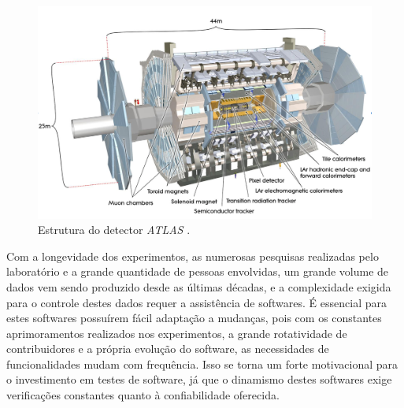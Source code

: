 \begin{figure}[H]
    \centering
    \includegraphics[width=14cm]{source/2-contextualizacao/images/atlas-detector.png}
    \caption{Estrutura do detector \emph{ATLAS} \cite{atlas}.}
    \label{fig:atlas-detector}
\end{figure}

Com a longevidade dos experimentos, as numerosas pesquisas realizadas pelo laboratório e a grande quantidade de pessoas envolvidas, um grande volume de dados vem sendo produzido desde as últimas décadas, e a complexidade exigida para o controle destes dados requer a assistência de softwares. É essencial para estes softwares possuírem fácil adaptação a mudanças, pois com os constantes aprimoramentos realizados nos experimentos, a grande rotatividade de contribuidores e a própria evolução do software, as necessidades de funcionalidades mudam com frequência. Isso se torna um forte motivacional para o investimento em testes de software, já que o dinamismo destes softwares exige verificações constantes quanto à confiabilidade oferecida.